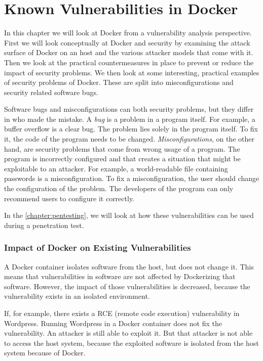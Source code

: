\chapter{Known Vulnerabilities in Docker}\label{chapter:vulnerabilities}
In this chapter we will look at Docker from a vulnerability analysis perspective. First we will look conceptually at Docker and security by examining the attack surface of Docker on an host and the various attacker models that come with it. Then we look at the practical countermeasures in place to prevent or reduce the impact of security problems. We then look at some interesting, practical examples of security problems of Docker. These are split into misconfigurations and security related software bugs.

\hfill

Software bugs and misconfigurations can both security problems, but they differ in who made the mistake. A \emph{bug} is a problem in a program itself. For example, a buffer overflow is a clear bug. The problem lies solely in the program itself. To fix it, the code of the program needs to be changed. \emph{Misconfigurations}, on the other hand, are security problems that come from wrong usage of a program. The program is incorrectly configured and that creates a situation that might be exploitable to an attacker. For example, a world-readable file containing passwords is a misconfiguration. To fix a misconfiguration, the user should change the configuration of the problem. The developers of the program can only recommend users to configure it correctly.

\hfill

In the \autoref{chapter:pentesting}, we will look at how these vulnerabilities can be used during a penetration test.

\subsection*{Impact of Docker on Existing Vulnerabilities}
A Docker container isolates software from the host, but does not change it. This means that vulnerabilities in software are not affected by Dockerizing that software. However, the impact of those vulnerabilities is decreased, because the vulnerability exists in an isolated environment.

If, for example, there exists a RCE (remote code execution) vulnerability in Wordpress. Running Wordpress in a Docker container does not fix the vulnerability. An attacker is still able to exploit it. But that attacker is not able to access the host system, because the exploited software is isolated from the host system because of Docker.





